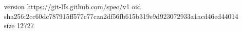 version https://git-lfs.github.com/spec/v1
oid sha256:2cc60dc787915ff577c77caa2df56fb615b319e9d923072933a1acd46ed44014
size 12727
